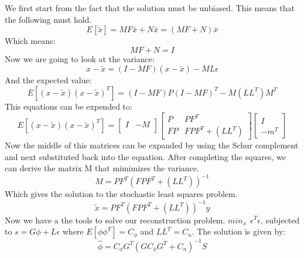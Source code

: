 \documentclass{article}
\begin{document}
We first start from the fact that the solution must be unbiased. This means that the following must hold.
$$ E[\tilde{x}]=MF\bar{x} + N\bar{x}=(MF+N)\bar{x}$$
Which means:
$$MF+N=I$$  
Now we are going to look at the variance:
$$x-\tilde{x}=(I-MF)(x-\tilde{x})-ML\epsilon$$
And the expected value:
$$ E[(x-\tilde{x})(x-\tilde{x})^T] = (I-MF)P(I-MF)^T - M(LL^T)M^T$$
This equations can be expended to:
$$ E[(x-\tilde{x})(x-\tilde{x})^T] =
\begin{bmatrix}
I & -M \\
\end{bmatrix}
\begin{bmatrix}
P  & PF^T \\
FP & FPF^T+(LL^T)
\end{bmatrix}
\begin{bmatrix}
I  \\
-m^T
\end{bmatrix}
$$ 
Now the middle of this matrices can be expanded by using the Schur complement and next substituted back into the equation. After completing the squares, we can derive the matrix M that mimimizes the variance.
$$ M = PF^T(FPF^T+(LL^T))^{-1}$$
Which gives the solution to the stochastic least squares problem.
$$\tilde{x} = PF^T(FPF^T+(LL^T))^{-1}y$$
Now we have a the tools to solve our reconstruction problem.
\newline
\newline
$ min_x \ \ \epsilon^T \epsilon $, subjected to $ s=G\phi + L\epsilon$
\newline
\newline
where $E[\phi\phi^T]=C_\phi$ and $LL^T=C_n$. The solution is given by:
$$\hat{\phi} = C_\phi G^T(GC_\phi G^T + C_n)^{-1}S $$
\end{document}
